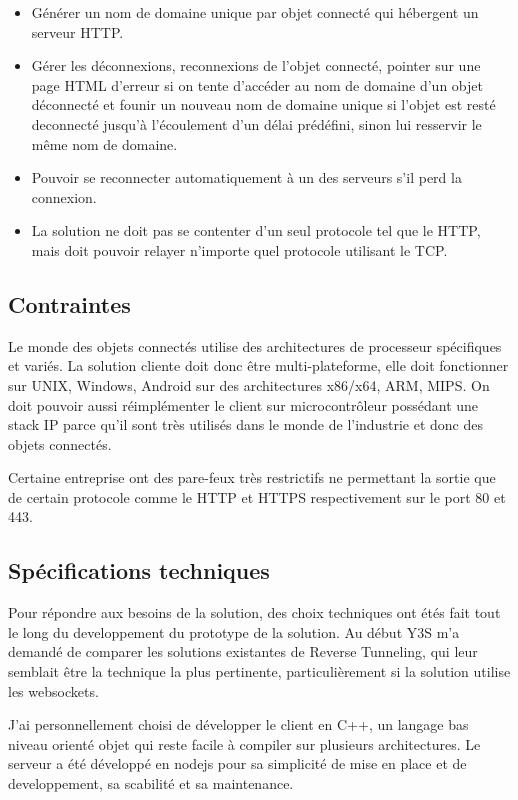 \begin{itemize}
    \item Générer un nom de domaine unique par objet connecté qui hébergent un serveur HTTP.
    \item Gérer les déconnexions, reconnexions de l'objet connecté, pointer sur une page HTML d'erreur si on tente d'accéder au nom de domaine d'un objet déconnecté et founir un nouveau nom de domaine unique si l'objet est resté deconnecté jusqu'à l'écoulement d'un délai prédéfini, sinon lui resservir le même nom de domaine.
    \item Pouvoir se reconnecter automatiquement à un des serveurs s'il perd la connexion.
    \item La solution ne doit pas se contenter d'un seul protocole tel que le HTTP, mais doit pouvoir relayer n'importe quel protocole utilisant le TCP.
\end{itemize}

\subsection{Contraintes}

Le monde des objets connectés utilise des architectures de processeur spécifiques et variés. La solution cliente doit donc être multi-plateforme, elle doit fonctionner sur UNIX, Windows, Android sur des architectures x86/x64, ARM, MIPS. On doit pouvoir aussi réimplémenter le client sur microcontrôleur possédant une stack IP parce qu'il sont très utilisés dans le monde de l'industrie et donc des objets connectés.

Certaine entreprise ont des pare-feux très restrictifs ne permettant la sortie que de certain protocole comme le HTTP et HTTPS respectivement sur le port 80 et 443.

\subsection{Spécifications techniques}

Pour répondre aux besoins de la solution, des choix techniques ont étés fait tout le long du developpement du prototype de la solution. Au début Y3S m'a demandé de comparer les solutions existantes de Reverse Tunneling, qui leur semblait être la technique la plus pertinente, particulièrement si la solution utilise les websockets.

J'ai personnellement choisi de développer le client en C++, un langage bas niveau orienté objet qui reste facile à compiler sur plusieurs architectures. Le serveur a été développé en nodejs pour sa simplicité de mise en place et de developpement, sa scabilité et sa maintenance.

